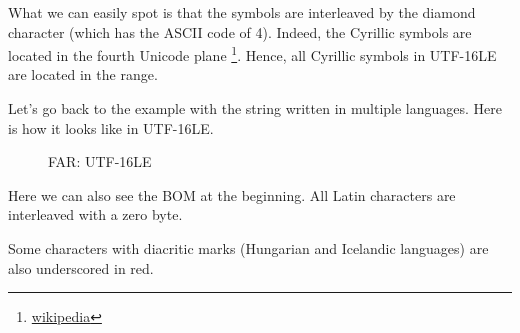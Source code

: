 What we can easily spot is that the symbols are interleaved by the diamond character (which has the ASCII code of 4).
Indeed, the Cyrillic symbols are located in the fourth Unicode plane
\footnote{\href{http://go.yurichev.com/17003}{wikipedia}}.
Hence, all Cyrillic symbols in UTF-16LE are located in the  range.

Let's go back to the example with the string written in multiple languages.
Here is how it looks like in UTF-16LE.

\begin{figure}[H]
\centering
{}
\caption{FAR: UTF-16LE}
\end{figure}

Here we can also see the \ac{BOM} at the beginning.
All Latin characters are interleaved with a zero byte.

Some characters with diacritic marks (Hungarian and Icelandic languages) are also underscored in red.



